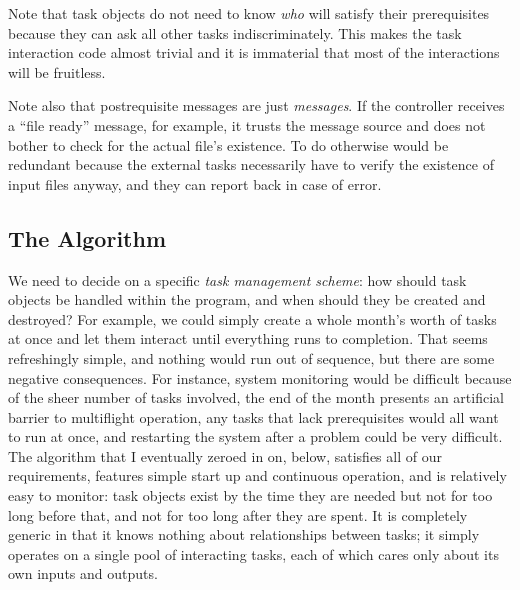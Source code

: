 \documentclass[12pt]{article}
\begin{document}
Note that task objects do not need to know {\em who} will satisfy their
prerequisites because they can ask all other tasks indiscriminately.
This makes the task interaction code almost trivial and it is immaterial
that most of the interactions will be fruitless. 

Note also that postrequisite messages are just {\em messages}. If the
controller receives a ``file ready'' message, for example, it trusts the
message source and does not bother to check for the actual file's
existence. To do otherwise would be redundant because the external tasks
necessarily have to verify the existence of input files anyway, and they
can report back in case of error.


\subsection{The Algorithm}

We need to decide on a specific {\em task management scheme}: how should
task objects be handled within the program, and when should they be
created and destroyed?  For example, we could simply create a whole
month's worth of tasks at once and let them interact until everything
runs to completion. That seems refreshingly simple, and nothing would
run out of sequence, but there are some negative consequences. For
instance, system monitoring would be difficult because of the sheer
number of tasks involved, the end of the month presents an artificial
barrier to multiflight operation, any tasks that lack prerequisites
would all want to run at once, and restarting the system after a problem
could be very difficult. The algorithm that I eventually zeroed in on,
below, satisfies all of our requirements, features simple start up and
continuous operation, and is relatively easy to monitor: task objects
exist by the time they are needed but not for too long before that, and
not for too long after they are spent. It is completely generic in that
it knows nothing about relationships between tasks; it simply operates
on a single pool of interacting tasks, each of which cares only about
its own inputs and outputs.  
\end{document}
